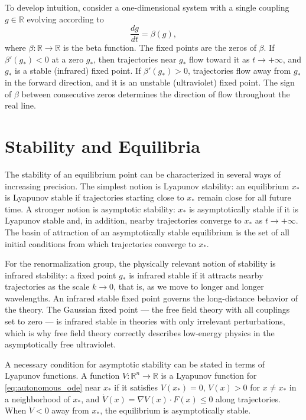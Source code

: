 \documentclass[11pt, twoside, openright]{book}
\theoremstyle{dotted}
\theoremstyle{definition}
\begin{document}
To develop intuition, consider a one-dimensional system with a single coupling
$g \in \mathbb{R}$ evolving according to
\begin{equation}
  \frac{dg}{dt} = \beta(g),
  \label{eq:beta_1d}
\end{equation}
where $\beta: \mathbb{R} \to \mathbb{R}$ is the beta function. The fixed points are
the zeros of $\beta$. If $\beta'(g_*) < 0$ at a zero $g_*$, then trajectories near
$g_*$ flow toward it as $t \to +\infty$, and $g_*$ is a stable (infrared)
fixed point. If $\beta'(g_*) > 0$, trajectories flow away from $g_*$ in the forward
direction, and it is an unstable (ultraviolet) fixed point. The sign of $\beta$
between consecutive zeros determines the direction of flow throughout the real line.

\section{Stability and Equilibria}

The stability of an equilibrium point can be characterized in several ways of
increasing precision. The simplest notion is Lyapunov stability: an equilibrium
$x_*$ is Lyapunov stable if trajectories starting close to $x_*$ remain close for
all future time. A stronger notion is asymptotic stability: $x_*$ is asymptotically
stable if it is Lyapunov stable and, in addition, nearby trajectories converge to
$x_*$ as $t \to +\infty$. The basin of attraction of an asymptotically stable
equilibrium is the set of all initial conditions from which trajectories converge
to $x_*$.

For the renormalization group, the physically relevant notion of stability is
infrared stability: a fixed point $g_*$ is infrared stable if it attracts nearby
trajectories as the scale $k \to 0$, that is, as we move to longer and longer
wavelengths. An infrared stable fixed point governs the long-distance behavior of
the theory. The Gaussian fixed point --- the free field theory with all couplings
set to zero --- is infrared stable in theories with only irrelevant perturbations,
which is why free field theory correctly describes low-energy physics in the
asymptotically free ultraviolet.

A necessary condition for asymptotic stability can be stated in terms of Lyapunov
functions. A function $V: \mathbb{R}^n \to \mathbb{R}$ is a Lyapunov function for
\eqref{eq:autonomous_ode} near $x_*$ if it satisfies $V(x_*) = 0$, $V(x) > 0$ for
$x \neq x_*$ in a neighborhood of $x_*$, and $\dot V(x) = \nabla V(x) \cdot F(x)
\leq 0$ along trajectories. When $\dot V < 0$ away from $x_*$, the equilibrium is
asymptotically stable.
\end{document}
